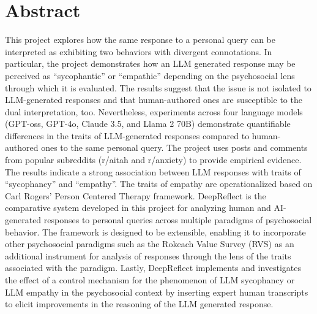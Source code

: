 \chapter*{\Large \center Abstract}

This project explores how the same response to a personal query can be interpreted as exhibiting two behaviors with divergent connotations. In particular, the project demonstrates how an LLM generated response may be perceived as “sycophantic” or “empathic” depending on the psychosocial lens through which it is evaluated. The results suggest that the issue is not isolated to LLM-generated responses and that human-authored ones are susceptible to the dual interpretation, too.
Nevertheless, experiments across four language models (GPT-oss, GPT-4o, Claude 3.5, and Llama 2 70B) demonstrate quantifiable differences in the traits of LLM-generated responses compared to human-authored ones to the same personal query. The project uses posts and comments from popular subreddits (r/aitah and r/anxiety) to provide empirical evidence. The results indicate a strong association between LLM responses with traits of “sycophancy” and “empathy”. The traits of empathy are operationalized based on Carl Rogers' Person Centered Therapy framework. DeepReflect is the comparative system developed in this project for analyzing human and AI-generated responses to personal queries across multiple paradigms of psychosocial behavior. The framework is designed to be extensible, enabling it to incorporate other psychosocial paradigms such as the Rokeach Value Survey (RVS) as an additional instrument for analysis of responses through the lens of the traits associated with the paradigm. Lastly, DeepReflect implements and investigates the effect of a control mechanism for the phenomenon of LLM sycophancy or LLM empathy in the psychosocial context by inserting expert human transcripts to elicit improvements in the reasoning of the LLM generated response.
